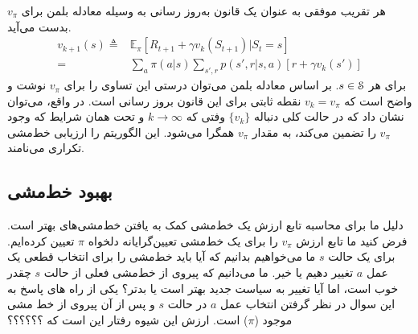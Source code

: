  هر تقریب موفقی به عنوان یک قانون به‌روز رسانی به وسیله معادله بلمن برای
$v_\pi$
بدست می‌آید. 
\begin{align}
v_{k+1}(s) \triangleq & \mathbb{E}_{\pi} [R_{t+1} + \gamma v_k(S_{t+1}) | S_t=s]  \nonumber \\
=& \sum_{a} \pi(a|s) \sum_{s',r} p(s',r | s,a)[r + \gamma v_k(s')]
\end{align}
 برای هر 
 $s \in \EuScript{S}$.
 بر اساس معادله بلمن می‌توان درستی این تساوی را برای 
$v_{\pi}$
نوشت و واضح است که 
 $v_k = v_{\pi}$
 نقطه ثابتی برای این قانون بروز رسانی است.
 در واقع، می‌توان نشان داد که در حالت کلی دنباله 
 $\{ v_k \}$
وفتی که 
$ k \rightarrow \infty $
و تحت همان شرایط که وجود 
$v_{\pi}$
را تضمین می‌کند، به مقدار 
$v_{\pi}$
همگرا می‌شود.  این الگوریتم را ارزیابی خط‌مشی تکراری
 می‌نامند.
 
% 
%

\subsection{بهبود خط‌مشی}

دلیل ما برای محاسبه تابع ارزش یک خط‌مشی کمک به یافتن خط‌مشی‌های بهتر است.
فرض کنید ما تابع ارزش 
$v_{\pi}$
 را برای یک خط‌مشی تعیین‌گرایانه دلخواه 
 $\pi$
  تعیین کرده‌ایم. برای یک حالت 
  $s$
 ما می‌خواهیم بدانیم که آیا باید خط‌مشی را برای انتخاب قطعی یک عمل 
 $a$
  تغییر دهیم یا خیر.
ما می‌دانیم که پیروی از خط‌مشی فعلی از حالت
 $s$
  چقدر خوب است، اما آیا تغییر به سیاست جدید بهتر است یا بدتر؟
  یکی از راه های پاسخ به این سوال در نظر گرفتن انتخاب عمل  $a$
در حالت 
$s$
و پس از آن پیروی از خط مشی موجود
($\pi$)
 است. 
 ارزش این شیوه رفتار این است که ؟؟؟؟؟؟

